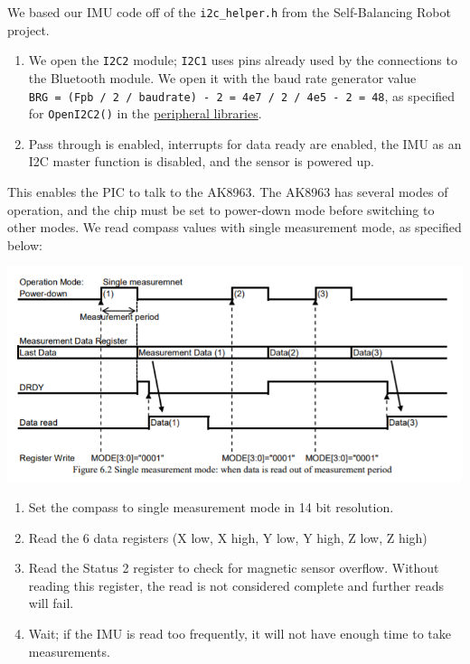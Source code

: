 \documentclass[]{article}
\providecommand{\tightlist}{%
  \setlength{\itemsep}{0pt}\setlength{\parskip}{0pt}}
\begin{document}
We based our IMU code off of the \texttt{i2c\_helper.h} from the Self-Balancing Robot project. \cite{selfbalancingrobot}

\begin{enumerate}
\def\labelenumi{\arabic{enumi}.}
\tightlist
\item
  We open the \texttt{I2C2} module; \texttt{I2C1} uses pins already used
  by the connections to the Bluetooth module. We open it with the baud
  rate generator value
  \texttt{BRG\ =\ (Fpb\ /\ 2\ /\ baudrate)\ -\ 2\ =\ 4e7\ /\ 2\ /\ 4e5\ -\ 2\ =\ 48},
  as specified for \texttt{OpenI2C2()} in the
  \protect\hyperlink{references}{peripheral libraries}.
\item
  Pass through is enabled, interrupts for data ready are enabled, the
  IMU as an I2C master function is disabled, and the sensor is powered
  up.
\end{enumerate}

This enables the PIC to talk to the AK8963. The AK8963 has several modes
of operation, and the chip must be set to power-down mode before
switching to other modes. We read compass values with single measurement
mode, as specified below:

\includegraphics{imu_single_measurement.png}

\begin{enumerate}
\def\labelenumi{\arabic{enumi}.}
\tightlist
\item
  Set the compass to single measurement mode in 14 bit resolution.
\item
  Read the 6 data registers (X low, X high, Y low, Y high, Z low, Z
  high)
\item
  Read the Status 2 register to check for magnetic sensor overflow.
  Without reading this register, the read is not considered complete and
  further reads will fail.
\item
  Wait; if the IMU is read too frequently, it will not have enough time
  to take measurements.
\end{enumerate}
\end{document}
